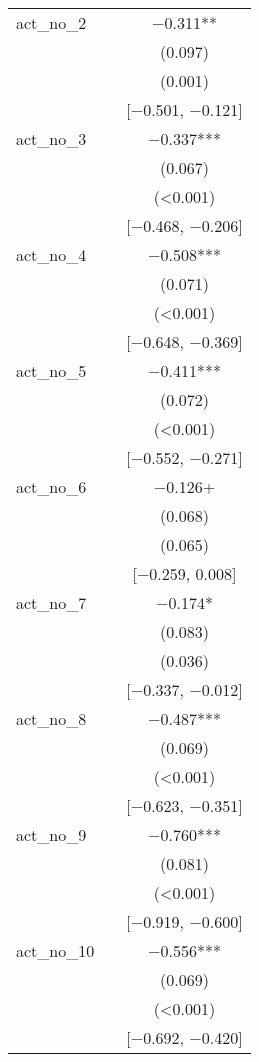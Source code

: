 \documentclass[
]{article}
\begin{document}
\begin{table}[H]
\begin{tabular}[t]{lcc}
act\_no\_2 &  & \num{-0.311}**\\
 &  & (\num{0.097})\\
 &  & (\num{0.001})\\
 &  & {}[\num{-0.501}, \num{-0.121}]\\
act\_no\_3 &  & \num{-0.337}***\\
 &  & (\num{0.067})\\
 &  & \vphantom{15} (\num{<0.001})\\
 &  & {}[\num{-0.468}, \num{-0.206}]\\
act\_no\_4 &  & \num{-0.508}***\\
 &  & \vphantom{1} (\num{0.071})\\
 &  & \vphantom{14} (\num{<0.001})\\
 &  & {}[\num{-0.648}, \num{-0.369}]\\
act\_no\_5 &  & \num{-0.411}***\\
 &  & (\num{0.072})\\
 &  & \vphantom{13} (\num{<0.001})\\
 &  & {}[\num{-0.552}, \num{-0.271}]\\
act\_no\_6 &  & \num{-0.126}+\\
 &  & (\num{0.068})\\
 &  & (\num{0.065})\\
 &  & {}[\num{-0.259}, \num{0.008}]\\
act\_no\_7 &  & \num{-0.174}*\\
 &  & (\num{0.083})\\
 &  & (\num{0.036})\\
 &  & {}[\num{-0.337}, \num{-0.012}]\\
act\_no\_8 &  & \num{-0.487}***\\
 &  & \vphantom{1} (\num{0.069})\\
 &  & \vphantom{12} (\num{<0.001})\\
 &  & {}[\num{-0.623}, \num{-0.351}]\\
act\_no\_9 &  & \num{-0.760}***\\
 &  & \vphantom{1} (\num{0.081})\\
 &  & \vphantom{11} (\num{<0.001})\\
 &  & {}[\num{-0.919}, \num{-0.600}]\\
act\_no\_10 &  & \num{-0.556}***\\
 &  & (\num{0.069})\\
 &  & \vphantom{10} (\num{<0.001})\\
 &  & {}[\num{-0.692}, \num{-0.420}]\\

\end{tabular}
\end{table}
\end{document}
